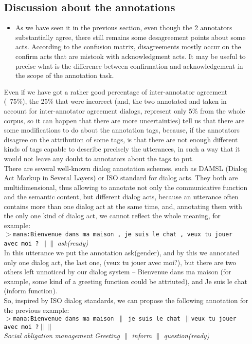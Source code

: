 \documentclass[a4paper]{article}
\begin{document}
\subsection{Discussion about the annotations}
\begin{itemize}
    \item As we have seen it in the previous section, even though the 2 annotators substantially agree, there still remains some desagreement points about some acts.
According to the confusion matrix, disagreements mostly occur on the confirm acts that are mistook with acknowledgment acts. It may be useful to precise what is the difference between confirmation and acknowledgement in the scope of the annotation task.
\end{itemize}
Even if we have got a rather good percentage of inter-annotator agreement (~75\%), the 25\% that were incorrect (and, the two annotated and taken in account for inter-annotator agreement dialogs, represent only 5\% from the whole corpus, so it can happen that there are more uncertainties) tell us that there are some modifications to do about the annotation tags, because, if the annotators disagree on the attribution of some tags, is that there are not enough different kinds of tags capable to describe precisely the utterances, in such a way that it would not leave any doubt to annotators about the tags to put.\\

There are several well-known dialog annotation schemes, such as DAMSL (Dialog Act Markup in Several Layers) or ISO standard for dialog acts. They both are multidimensional, thus allowing to annotate not only the communicative function and the semantic content, but different dialog acts, because an utterance often contains more than one dialog act at the same time, and, annotating them with the only one kind of dialog act, we cannot reflect the whole meaning, for example:\\
$>$\texttt{mana:Bienvenue dans ma maison , je suis le chat , veux tu jouer avec moi ?} $\|\|$ \emph{\small ask(ready)}\\
In this utterance we put the annotation ask(gender), and by this we annotated only one dialog act, the last one, (veux tu jouer avec moi?), but there are two others left unnoticed by our dialog system – Bienvenue dans ma maison (for example, some kind of a greeting function could be attriuted), and Je suis le chat (inform function).\\

So, inspired by ISO dialog standards, we can propose the following annotation for the previous example:\\
$>$\texttt{mana:Bienvenue dans ma maison $\|$  je suis le chat $\|$veux tu jouer avec moi ?}$\|\|$\\
\emph{\small Social obligation management Greeting $\|$ inform $\|$ question(ready)}\\
\end{document}
